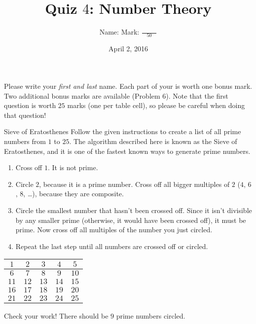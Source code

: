 \documentclass[12pt,letterpaper]{article}
\title{Quiz $4$: Number Theory}
\author{Name: \underline{\hspace{5cm}} Mark: $\displaystyle \frac{\hspace{3em}}{50}$}
\date{April 2, 2016}
\begin{document}
\maketitle

Please write your \emph{first and last} name. Each part of your is worth one
bonus mark. Two additional bonus marks are available (Problem 6). Note that the
first question is worth $25$ marks (one per table cell), so please be careful
when doing that question!

\thispagestyle{empty}

\begin{problem}{Sieve of Eratosthenes}
 Follow the given instructions to create a list of all prime numbers from $1$
 to $25$. The algorithm described here is known as the Sieve of Eratosthenes,
 and it is one of the fastest known ways to generate prime numbers.

 \begin{enumerate}
  \item Cross off $1$. It is not prime.
  \item Circle $2$, because it is a prime number. Cross off all bigger multiples
  of $2$ ($4$, $6$, $8$, \dots), because they are composite.
  \item Circle the smallest number that hasn't been crossed off. Since it isn't
  divisible by any smaller prime (otherwise, it would have been crossed off),
  it must be prime. Now cross off all multiples of the number you just circled.
  \item Repeat the last step until all numbers are crossed off or circled.
 \end{enumerate}

 \begin{center}
  \def\arraystretch{1.7}
  \begin{tabular}{|c|c|c|c|c|}
   \hline
   $1$ & $2$ & $3$ & $4$ & $5$ \\
   \hline
   $6$ & $7$ & $8$ & $9$ & $10$ \\
   \hline
   $11$ & $12$ & $13$ & $14$ & $15$ \\
   \hline
   $16$ & $17$ & $18$ & $19$ & $20$ \\
   \hline
   $21$ & $22$ & $23$ & $24$ & $25$ \\
   \hline
  \end{tabular}
 \end{center}

 Check your work! There should be $9$ prime numbers circled.
\end{problem}
\end{document}
